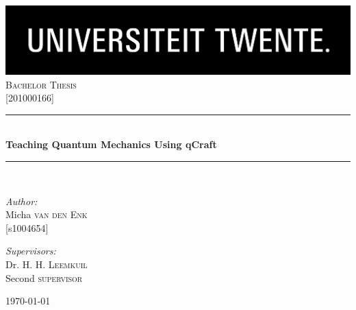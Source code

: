 \documentclass[11pt,twoside]{report} %
\newcommand{\HRule}{\rule{\linewidth}{0.5mm}}
\newcommand\blankpage{%
    \null
    \thispagestyle{empty}%
    \newpage}
\begin{document}
\begin{titlepage}

\begin{center}


\includegraphics[width=1\textwidth]{./logo}\\[1cm]    

\textsc{\Large Bachelor Thesis}\\[0.5cm]
\textsc{\Large {[}201000166{]}}\\[0.5cm]


\HRule \\[0.4cm]
{ \huge \bfseries Teaching Quantum Mechanics Using qCraft}\\[0.4cm]

\HRule \\[1.5cm]

\begin{minipage}{0.4\textwidth}
\begin{flushleft} \large
\emph{Author:}\\
Micha \textsc{van den Enk} \\
{[}s1004654{]} \\
\end{flushleft}
\end{minipage}
\begin{minipage}{0.4\textwidth}
\begin{flushright} \large
\emph{Supervisors:} \\
Dr. H. H. \textsc{Leemkuil} \\
Second \textsc{supervisor} \\
\end{flushright}
\end{minipage}

\vfill

{\large \today}

\end{center}

\end{titlepage}

\afterpage{\blankpage}

\setcounter{tocdepth}{1}
\tableofcontents
\thispagestyle{fancy}
\newpage
\end{document}
